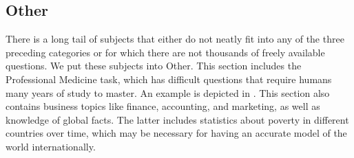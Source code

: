 




\subsection{Other}
There is a long tail of subjects that either do not neatly fit into any of the three preceding categories or for which there are not thousands of freely available questions. We put these subjects into Other.
This section includes the Professional Medicine task, which has difficult questions that require humans many years of study to master.
An example is depicted in .
This section also contains business topics like finance, accounting, and marketing, as well as knowledge of global facts. The latter includes statistics about poverty in different countries over time, which may be necessary for having an accurate model of the world internationally.


